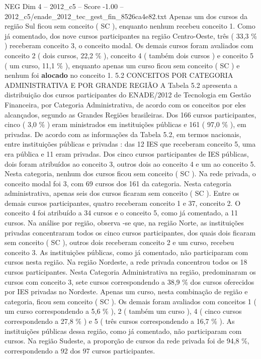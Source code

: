 \begin{textsample}{NEG Dim 4 – 2012\_c5 – Score -1.00 – 2012\_c5/enade\_2012\_tec\_gest\_fin\_8526ca4e82.txt}
Apenas um dos cursos da região Sul ficou sem conceito ( SC ), enquanto nenhum recebeu conceito 1.
Como já comentado, dos nove cursos participantes na região Centro-Oeste, três ( 33,3 \% ) receberam conceito 3, o conceito modal.
Os demais cursos foram avaliados com conceito 2 ( dois cursos, 22,2 \% ), conceito 4 ( também dois cursos ) e conceito 5 ( um curso, 11,1 \% ), enquanto apenas um curso ficou sem conceito ( SC ) e nenhum foi \textbf{alocado} no conceito 1. 5.2 CONCEITOS POR CATEGORIA ADMINISTRATIVA E POR GRANDE REGIÃO A Tabela 5.2 apresenta a distribuição dos cursos participantes do ENADE/2012 de Tecnologia em Gestão Financeira, por Categoria Administrativa, de acordo com os conceitos por eles alcançados, segundo as Grandes Regiões brasileiras.
Dos 166 cursos participantes, cinco ( 3,0 \% ) eram ministrados em instituições públicas e 161 ( 97,0 \% ), em privadas.
De acordo com as informações da Tabela 5.2, em termos nacionais, entre instituições públicas e privadas : das 12 IES que receberam conceito 5, uma era pública e 11 eram privadas.
Dos cinco cursos participantes de IES públicas, dois foram atribuídos ao conceito 3, outros dois ao conceito 4 e um ao conceito 5.
Nesta categoria, nenhum dos cursos ficou sem conceito ( SC ).
Na rede privada, o conceito modal foi 3, com 69 cursos dos 161 da categoria.
Nesta categoria administrativa, apenas seis dos cursos ficaram sem conceito ( SC ).
Entre os demais cursos participantes, quatro receberam conceito 1 e 37, conceito 2.
O conceito 4 foi atribuído a 34 cursos e o conceito 5, como já comentado, a 11 cursos.
Na análise por região, observa -se que, na região Norte, as instituições privadas concentraram todos os cinco cursos participantes, dos quais dois ficaram sem conceito ( SC ), outros dois receberam conceito 2 e um curso, recebeu conceito 3.
As instituições públicas, como já comentado, não participaram com cursos nesta região.
Na região Nordeste, a rede privada concentrou todos os 18 cursos participantes.
Nesta Categoria Administrativa na região, predominaram os cursos com conceito 3, sete cursos correspondendo a 38,9 \% dos cursos oferecidos por IES privadas no Nordeste.
Apenas um curso, nesta combinação de região e categoria, ficou sem conceito ( SC ).
Os demais foram avaliados com conceitos 1 ( um curso correspondendo a 5,6 \% ), 2 ( também um curso ), 4 ( cinco cursos correspondendo a 27,8 \% ) e 5 ( três cursos correspondendo a 16,7 \% ).
As instituições públicas dessa região, como já comentado, não participaram com cursos.
Na região Sudeste, a proporção de cursos da rede privada foi de 94,8 \%, correspondendo a 92 dos 97 cursos participantes.

\end{textsample}

